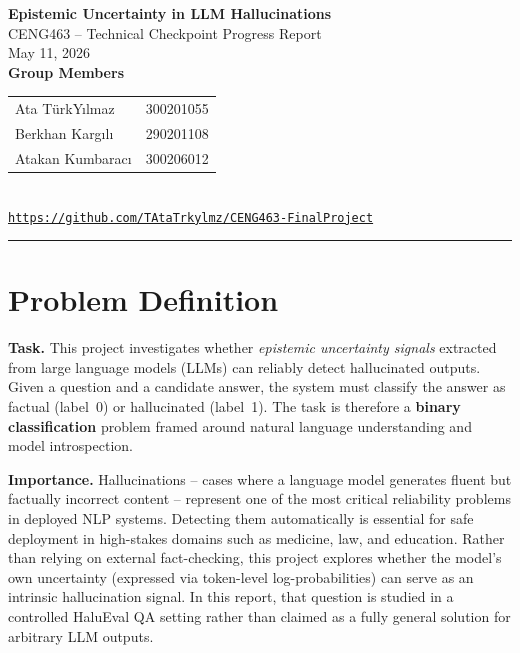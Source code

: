 \documentclass[12pt,a4paper]{article}
\begin{document}
\begin{center}
  \vspace*{2em} %
  {\LARGE\bfseries Epistemic Uncertainty in LLM Hallucinations}\\[1.5em]
  {\large CENG463 -- Technical Checkpoint Progress Report}\\[1.5em]
  {\normalsize May 11, 2026}\\[2.5em]
  
  \textbf{\large Group Members}\\[0.5em]
  \begin{tabular}{ll}
    Ata TürkYılmaz & 300201055 \\
    Berkhan Kargılı & 290201108 \\
    Atakan Kumbaracı & 300206012 \\
  \end{tabular}\\[2.5em]
  
  \small\texttt{\href{https://github.com/TAtaTrkylmz/CENG463-FinalProject}{https://github.com/TAtaTrkylmz/CENG463-FinalProject}}
\end{center}

\vspace{1.5em}
\noindent\rule{\linewidth}{0.6pt}

\newpage

\section{Problem Definition}

\textbf{Task.}
This project investigates whether \emph{epistemic uncertainty signals} extracted from large language models (LLMs) can reliably detect hallucinated outputs. Given a question and a candidate answer, the system must classify the answer as factual (label~0) or hallucinated (label~1). The task is therefore a \textbf{binary classification} problem framed around natural language understanding and model introspection.

\textbf{Importance.}
Hallucinations -- cases where a language model generates fluent but factually incorrect content -- represent one of the most critical reliability problems in deployed NLP systems. Detecting them automatically is essential for safe deployment in high-stakes domains such as medicine, law, and education. Rather than relying on external fact-checking, this project explores whether the model's own uncertainty (expressed via token-level log-probabilities) can serve as an intrinsic hallucination signal. In this report, that question is studied in a controlled HaluEval QA setting rather than claimed as a fully general solution for arbitrary LLM outputs.
\end{document}
